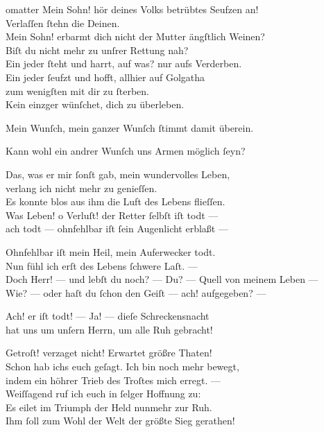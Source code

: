 \documentclass[shorttitlesize=50,tocstyle=ref-genre]{ees}
\begin{document}
{\begin{movement}{omatter}
    \voice[Maria]
    Mein Sohn! hör deines Volks betrübtes Seufzen an!\\
    Verlaſſen ſtehn die Deinen.\\
    Mein Sohn! erbarmt dich nicht der Mutter ängſtlich Weinen?\\
    Biſt du nicht mehr zu unſrer Rettung nah?\\
    Ein jeder ſteht und harrt, auf was? nur aufs Verderben.\\
    Ein jeder ſeufzt und hofft, allhier auf Golgatha\\
    zum wenigſten mit dir zu ſterben.\\
    Kein einzger wünſchet, dich zu überleben.

    \voice[Eidli]
    Mein Wunſch, mein ganzer Wunſch ſtimmt damit überein.

    Kann wohl ein andrer Wunſch uns Armen möglich ſeyn?\\\strut

    \voice[Eidli]
    Das, was er mir ſonſt gab, mein wundervolles Leben,\\
    verlang ich nicht mehr zu genieſſen.\\
    Es konnte blos aus ihm die Luft des Lebens flieſſen.\\
    Was Leben! o Verluſt! der Retter ſelbſt iſt todt —\\
    ach todt — ohnfehlbar iſt ſein Augenlicht erblaßt —

    \voice[Lazarus]
    Ohnfehlbar iſt mein Heil, mein Auferwecker todt.\\
    Nun fühl ich erſt des Lebens ſchwere Laſt. —\\
    Doch Herr! — und lebſt du noch? — Du? — Quell von meinem Leben —\\
    Wie? — oder haſt du ſchon den Geiſt — ach! aufgegeben? —

    Ach! er iſt todt! — Ja! — dieſe Schreckensnacht\\
    hat uns um unſern Herrn, um alle Ruh gebracht!

    \voice[Johannes]
    Getroſt! verzaget nicht! Erwartet größre Thaten!\\
    Schon hab ichs euch geſagt. Ich bin noch mehr bewegt,\\
    indem ein höhrer Trieb des Troſtes mich erregt. —\\
    Weiſſagend ruf ich euch in ſelger Hoffnung zu:\\
    Es eilet im Triumph der Held nunmehr zur Ruh.\\
    Ihm ſoll zum Wohl der Welt der größte Sieg gerathen!


\end{movement}}
\end{document}
